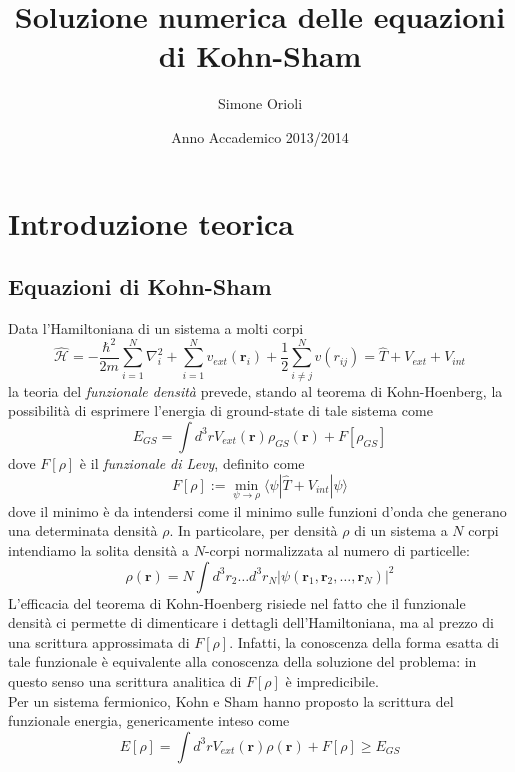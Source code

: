 \documentclass[11pt,a4paper]{article}
\begin{document}
\title{Soluzione numerica delle equazioni di Kohn-Sham} 
\author{Simone Orioli} 
\date{Anno Accademico 2013/2014} 
\maketitle
\tableofcontents
\newpage

\section{Introduzione teorica}
\subsection{Equazioni di Kohn-Sham}
Data l'Hamiltoniana di un sistema a molti corpi
\begin{equation}
\mathcal{\hat{H}} = -\frac{\hbar^2}{2m}\sum_{i=1}^N \nabla_i^2 + \sum_{i=1}^N v_{ext}(\textbf{r}_i) + \frac{1}{2}\sum_{i\not=j}^N v(r_{ij}) = \hat{T} + V_{ext} + V_{int}
\end{equation} 
la teoria del \emph{funzionale densità} prevede, stando al teorema di Kohn-Hoenberg, la possibilità di esprimere l'energia di ground-state di tale sistema come
\begin{equation}
E_{GS} = \int d^3 r V_{ext}(\textbf{r})\rho_{GS}(\textbf{r}) + F[\rho_{GS}]
\end{equation}
dove $F[\rho]$ è il \emph{funzionale di Levy}, definito come
\begin{equation}
F[\rho] := \min_{\psi \to \rho} \langle \psi | \hat{T} + V_{int} | \psi \rangle
\end{equation}
dove il minimo è da intendersi come il minimo sulle funzioni d'onda che generano una determinata densità $\rho$. In particolare, per densità $\rho$ di un sistema a $N$ corpi intendiamo la solita densità a $N$-corpi normalizzata al numero di particelle:
\[
\rho(\textbf{r}) = N \int d^3r_2\ldots d^3r_N |\psi(\textbf{r}_1,\textbf{r}_2,\ldots ,\textbf{r}_N)|^2
\]
L'efficacia del teorema di Kohn-Hoenberg risiede nel fatto che il funzionale densità ci permette di dimenticare i dettagli dell'Hamiltoniana, ma al prezzo di una scrittura approssimata di $F[\rho]$. Infatti, la conoscenza della forma esatta di tale funzionale è equivalente alla conoscenza della soluzione del problema: in questo senso una scrittura analitica di $F[\rho]$ è impredicibile.
\\
Per un sistema fermionico, Kohn e Sham hanno proposto la scrittura del funzionale energia, genericamente inteso come
\[
E[\rho] = \int d^3 r V_{ext}(\textbf{r})\rho(\textbf{r}) + F[\rho] \geq E_{GS}
\]
\end{document}
